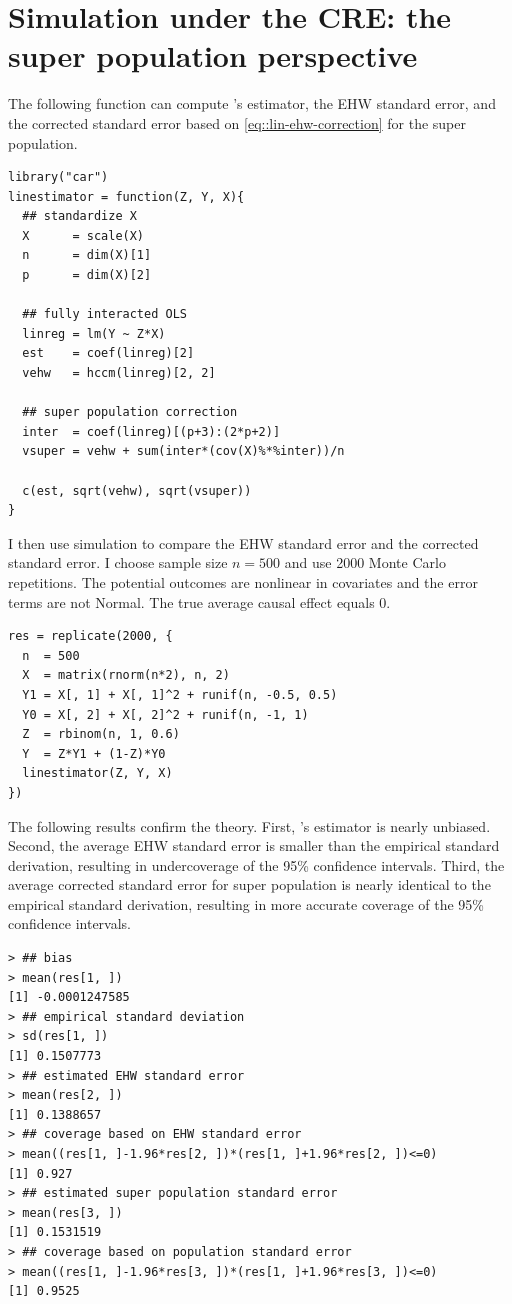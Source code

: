 \section{Simulation under the CRE: the super population perspective}
\label{sec::simulation-CRE-superp}


The following  function can compute \citet{lin2013}'s estimator, the EHW standard error, and the corrected standard error based on \eqref{eq::lin-ehw-correction} for the super population. 
\begin{lstlisting}
library("car")
linestimator = function(Z, Y, X){
  ## standardize X
  X      = scale(X)
  n      = dim(X)[1]
  p      = dim(X)[2]
  
  ## fully interacted OLS
  linreg = lm(Y ~ Z*X)
  est    = coef(linreg)[2]
  vehw   = hccm(linreg)[2, 2]
  
  ## super population correction
  inter  = coef(linreg)[(p+3):(2*p+2)]
  vsuper = vehw + sum(inter*(cov(X)%*%inter))/n
  
  c(est, sqrt(vehw), sqrt(vsuper))
}
\end{lstlisting}


I then use simulation to compare the EHW standard error and the corrected standard error. 
I choose sample size $n=500$ and use 2000 Monte Carlo repetitions. The potential outcomes are nonlinear in covariates and the error terms are not Normal. The true average causal effect equals $0.$
\begin{lstlisting}
res = replicate(2000, {
  n  = 500
  X  = matrix(rnorm(n*2), n, 2)
  Y1 = X[, 1] + X[, 1]^2 + runif(n, -0.5, 0.5)
  Y0 = X[, 2] + X[, 2]^2 + runif(n, -1, 1)
  Z  = rbinom(n, 1, 0.6)
  Y  = Z*Y1 + (1-Z)*Y0
  linestimator(Z, Y, X)
})
\end{lstlisting}


The following results confirm the theory. First, \citet{lin2013}'s estimator is nearly unbiased. 
Second, the average EHW standard error is smaller than the empirical standard derivation, resulting in undercoverage of the 95\% confidence intervals. 
Third, the average corrected standard error for super population is nearly identical to the empirical standard derivation, resulting in more accurate coverage of the 95\% confidence intervals.  
\begin{lstlisting}
> ## bias
> mean(res[1, ])
[1] -0.0001247585
> ## empirical standard deviation
> sd(res[1, ])
[1] 0.1507773
> ## estimated EHW standard error
> mean(res[2, ])
[1] 0.1388657
> ## coverage based on EHW standard error
> mean((res[1, ]-1.96*res[2, ])*(res[1, ]+1.96*res[2, ])<=0)
[1] 0.927
> ## estimated super population standard error
> mean(res[3, ])
[1] 0.1531519
> ## coverage based on population standard error
> mean((res[1, ]-1.96*res[3, ])*(res[1, ]+1.96*res[3, ])<=0)
[1] 0.9525
\end{lstlisting}


